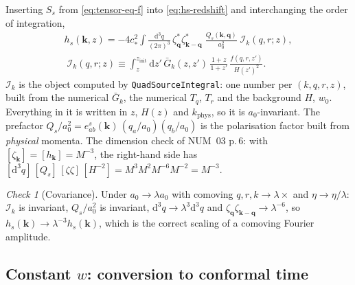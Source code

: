 \documentclass[11pt,a4paper]{article}
\newcommand{\dd}{\mathrm{d}}
\newcommand{\vk}{\mathbf{k}}
\newcommand{\vq}{\mathbf{q}}
\newcommand{\Gb}{\bar{G}}
\newcommand{\zinit}{z_{\mathrm{init}}}
\newcommand{\cstar}{c_{*}}
\newcommand{\kphys}{k_{\mathrm{phys}}}
\newcommand{\note}[1]{\textsf{#1}}
\theoremstyle{remark}
\newtheorem*{chk}{Check}
\begin{document}
Inserting $S_s$ from \eqref{eq:tensor-eq-f} into \eqref{eq:hs-redshift} and interchanging the order of integration,
\begin{equation}
\begin{gathered}
h_s(\vk,z) = -4\cstar^2\int\frac{\dd^3q}{(2\pi)^3}\,\zeta^*_{\vq}\zeta^*_{\vk-\vq}\;\frac{Q_s(\vk,\vq)}{a_0^2}\;\mathcal{I}_k(q,r;z),\\[4pt]
\boxed{\;
\mathcal{I}_k(q,r;z)\equiv\int_z^{\zinit}\dd z'\,\Gb_k(z,z')\,\frac{1+z}{1+z'}\,\frac{f(q,r,z')}{H(z')^2}.\;}
\end{gathered}
\label{eq:I-def}
\end{equation}
$\mathcal{I}_k$ is the object computed by \texttt{QuadSourceIntegral}: one number per $(k,q,r,z)$, built from the numerical $\Gb_k$, the numerical $T_q$, $T_r$ and the background $H$, $w_0$. Everything in it is written in $z$, $H(z)$ and $\kphys$, so it is $a_0$-invariant. The prefactor $Q_s/a_0^2 = e^s_{ab}(\vk)\,(q_a/a_0)(q_b/a_0)$ is the polarisation factor built from \emph{physical} momenta. The dimension check of \note{NUM}~03 p.\,6: with $[\zeta_{\vk}] = [h_{\vk}] = M^{-3}$, the right-hand side has $[\dd^3q]\,[Q_s]\,[\zeta\zeta]\,[H^{-2}] = M^{3}M^{2}M^{-6}M^{-2} = M^{-3}$.

\begin{chk}[Covariance]
Under $a_0\to\lambda a_0$ with comoving $q,r,k\to\lambda\times$ and $\eta\to\eta/\lambda$: $\mathcal{I}_k$ is invariant, $Q_s/a_0^2$ is invariant, $\dd^3q\to\lambda^3\dd^3q$ and $\zeta_{\vq}\zeta_{\vk-\vq}\to\lambda^{-6}$, so $h_s(\vk)\to\lambda^{-3}h_s(\vk)$, which is the correct scaling of a comoving Fourier amplitude.
\end{chk}

\subsection{Constant \texorpdfstring{$w$}{w}: conversion to conformal time}
\label{sec:I-to-J}
\end{document}
